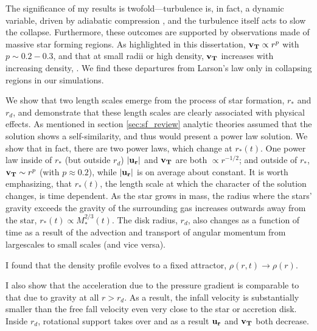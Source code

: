\documentclass[../dissertation.tex]{subfiles}
\begin{document}
The significance of my results is twofold---turbulence is, in fact, a dynamic variable, driven by adiabatic compression \citep{2012ApJ...750L..31R}, 
and the turbulence itself acts to slow the collapse. 
Furthermore, these outcomes are supported by observations made of massive star forming regions. 
As highlighted in this dissertation,  $\mathbf{v_T} \propto r^p$ with $ p \sim 0.2-0.3$, and that at small radii or high density, $\mathbf{v_T}$  
increases with increasing density, \citep{1997ApJ...476..730P}. 
We find these departures from Larson's law only in collapsing regions in our simulations. 

We show that two length scales emerge from the process of star formation, $r_*$ and $r_d$, and demonstrate
that these length scales are clearly associated with physical effects. 
As mentioned in section \ref{sec:sf_review} analytic theories assumed that the solution shows a self-similarity, and thus would present a power law solution.
We show that in fact, there are two power laws, which change at $r_*(t)$. 
One power law inside of $r_*$ (but outside $r_d$) $|\mathbf{u_r}|$ and  $\mathbf{v_T}$ are both
$\propto r^{-1/2}$; and outside of $r_*$, $\mathbf{v_T} \sim r^{p}$ (with $p\approx0.2$), while $|\mathbf{u_r}|$ 
is on average about constant. 
It is worth emphasizing, that $r_*(t)$, the length scale at which the character of the solution changes, is time dependent. 
As the star grows in mass, the radius where the stars' gravity exceeds the gravity of the surrounding gas increases outwards away from the star, 
$r_*(t) \propto M_*^{2/3}(t)$.
The disk radius, $r_d$, also changes as a function of time as a result of the advection and transport of angular momentum from largescales to small scales (and vice versa).

I found that the density profile evolves to a fixed attractor, $\rho(r,t ) \rightarrow \rho(r)$. 

I also show that the acceleration due to the pressure gradient is comparable to that due to gravity at all $r>r_d$. 
As a result, the infall velocity is substantially smaller than the free fall velocity
even very close to the star or accretion disk. 
Inside $r_d$, rotational support takes over and as a result $\mathbf{u_r}$ and $\mathbf{v_T}$ both decrease.  
\end{document}
